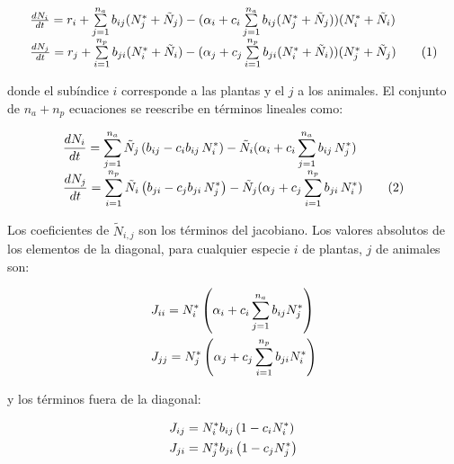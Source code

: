 \begin{equation}
\begin{array}{lcl}
\textstyle \frac{dN_{i}}{dt}=r_{i}+\sum\limits_{j=1}^{n_{a}}b_{ij}(N^{*}_{j}+\tilde{N}_{j})- (\alpha_{i}+c_{i}\sum\limits_{j=1}^{n_{a}}b_{ij}(N^{*}_j+\tilde{N}_{j}))(N^{*}_i+\tilde{N}_{i}) \nonumber\\
\textstyle \frac{dN_{j}}{dt}=r_{j}+\sum\limits_{i=1}^{n_{p}}b_{ji}(N^{*}_{i}+\tilde{N}_{i})-(\alpha_{j}+c_{j}\sum\limits_{i=1}^{n_{p}}b_{ji}(N^{*}_i+\tilde{N}_{i}))(N^{*}_j+\tilde{N}_{j}) 
\stepcounter{equation}\tag{\theequation}\label{eq:effrateTaylorN}
\end{array}
\end{equation}

\noindent donde el subíndice $i$ corresponde a las plantas y el $j$ a los animales. El conjunto de $n_{a} + n_{p}$ ecuaciones se reescribe en términos lineales como:

\begin{align}
\begin{array}{lcl}
\displaystyle \frac{dN_{i}}{dt} = \sum_{j=1}^{n_{a}} \tilde{N}_{j} \left(  b_{ij} - c_{i} b_{ij}\, N^{*}_i\right) - \tilde{N}_{i}(\alpha_{i}+ c_{i} \sum_{j=1}^{n_{a}} b_{ij} \, N^{*}_{j})\nonumber\\
\displaystyle \frac{dN_{j}}{dt} = \sum_{i=1}^{n_{p}} \tilde{N}_{i} \left( b_{ji} - c_{j} b_{ji}\, N^{*}_j\right) - \tilde{N}_{j}(\alpha_{j}+ c_{j} \sum_{i=1}^{n_{p}} b_{ji} \, N^{*}_{i})\stepcounter{equation}\tag{\theequation}\label{eq:effrateTaylor2N}
\end{array}
\end{align}

Los coeficientes de $\tilde{N}_{i,j}$ son los términos del jacobiano. Los valores absolutos de los elementos de la diagonal, para cualquier especie $i$ de plantas, $j$ de animales son:

\begin{align}
\displaystyle & J_{ii}=N^{*}_{i}\left(\alpha_{i} + c_{i} \sum_{j=1}^{n_{a}} b_{ij} N^{*}_{j}\right) \nonumber\\
\displaystyle & J_{jj}=N^{*}_{j}\left(\alpha_{j} + c_{j} \sum_{i=1}^{n_{p}} b_{ji} N^{*}_{i}\right)
\label{eq:Jii2}
\end{align}

\noindent y los términos fuera de la diagonal:

\begin{align}
\displaystyle & J_{ij}=N^{*}_{i}b_{ij}\left( 1-c_{i}N^{*}_{i}\right)\nonumber\\
\displaystyle & J_{ji}=N^{*}_{j}b_{ji}\left( 1-c_{j}N^{*}_{j}\right)
\label{eq:Jij}
\end{align}

